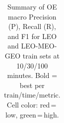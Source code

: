 \begin{table}[t]
{\begin{tabular}{l ccc ccc ccc ccc ccc ccc}
\bottomrule
\end{tabular}%
}
\caption{Summary of OE macro Precision (P), Recall (R), and F1 for LEO and LEO-MEO-GEO train sets at 10/30/100 minutes. Bold = best per train/time/metric. Cell color: red\,=\,low, green\,=\,high.}
\label{tab:class_leo_combined_energy_oe}
\end{table}
